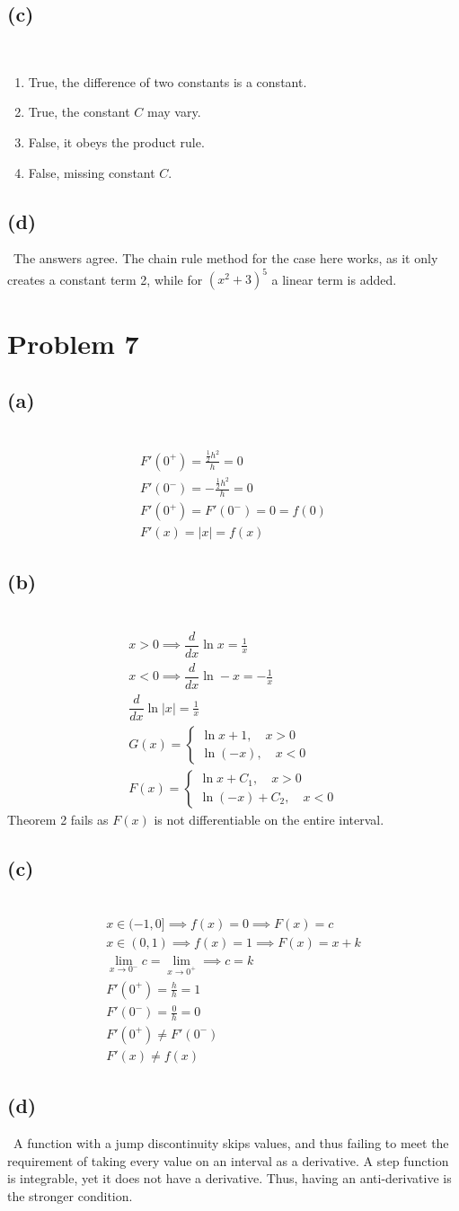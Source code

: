 \documentclass[12pt]{article}
\newcommand{\ddx}{\dfrac{d}{dx}}
\newcommand{\vem}{\vspace{0.5em}}
\newcommand{\problem}[1]{\section{Problem #1}}
\newcommand{\subproblem}[1]{\subsection{(#1)} \,}
\begin{document}
\subproblem{c}
\begin{enumerate}[label=(\roman*)]
    \item True, the difference of two constants is a constant.
    \item True, the constant $C$ may vary.
    \item False, it obeys the product rule.
    \item False, missing constant $C$.
\end{enumerate}

\subproblem{d}
The answers agree. The chain rule method for the case here works, as it only creates a constant term 2, while for $(x^2+3)^5$ a linear term is added. 

\problem{7}

\subproblem{a}
\begin{gather*}
    F'(0^+)=\frac{\frac{1}{2}h^2}{h}=0\\
    F'(0^-)=-\frac{\frac{1}{2}h^2}{h}=0\\
    F'(0^+)=F'(0^-)=0=f(0)\\
    F'(x)=|x|=f(x)
\end{gather*}

\subproblem{b}
\begin{gather*}
    x>0 \implies \ddx \ln x=\frac{1}{x}\\
    x<0\implies \ddx \ln-x=-\frac{1}{x}\\
    \ddx \ln |x|=\frac{1}{x}\\
    G(x)=\begin{cases}
        \ln x + 1,\quad x>0\\
        \ln (-x),\quad x<0
    \end{cases}\\
    F(x)=\begin{cases}
        \ln x+C_1,\quad x>0\\
        \ln (-x)+C_2,\quad x<0
    \end{cases}
\end{gather*}
Theorem 2 fails as $F(x)$ is not differentiable on the entire interval.\vem

\subproblem{c}
\begin{gather*}
    x\in (-1,0] \implies f(x)=0\implies F(x)=c\\
    x\in (0,1)\implies f(x)=1\implies F(x)=x+k\\
    \lim_{x \to 0^-} c=\lim_{x \to 0^+} \implies c=k\\
    F'(0^+)=\frac{h}{h}=1\\
    F'(0^-)=\frac{0}{h}=0\\
    F'(0^+)\ne F'(0^-)\\
    F'(x)\ne f(x)
\end{gather*}

\subproblem{d}
A function with a jump discontinuity skips values, and thus failing to meet the requirement of taking every value on an interval as a derivative. A step function is integrable, yet it does not have a derivative. Thus, having an anti-derivative is the stronger condition.
\end{document}
